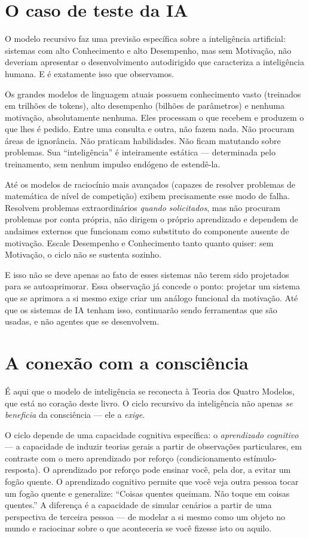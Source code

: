 \documentclass[11pt, twoside, openright]{book}
\begin{document}
\section*{O caso de teste da IA}

O modelo recursivo faz uma previsão específica sobre a inteligência artificial: sistemas com alto Conhecimento e alto Desempenho, mas sem Motivação, não deveriam apresentar o desenvolvimento autodirigido que caracteriza a inteligência humana. E é exatamente isso que observamos.

Os grandes modelos de linguagem atuais possuem conhecimento vasto (treinados em trilhões de tokens), alto desempenho (bilhões de parâmetros) e nenhuma motivação, absolutamente nenhuma. Eles processam o que recebem e produzem o que lhes é pedido. Entre uma consulta e outra, não fazem nada. Não procuram áreas de ignorância. Não praticam habilidades. Não ficam matutando sobre problemas. Sua ``inteligência'' é inteiramente estática --- determinada pelo treinamento, sem nenhum impulso endógeno de estendê-la.

Até os modelos de raciocínio mais avançados (capazes de resolver problemas de matemática de nível de competição) exibem precisamente esse modo de falha. Resolvem problemas extraordinários \textit{quando solicitados}, mas não procuram problemas por conta própria, não dirigem o próprio aprendizado e dependem de andaimes externos que funcionam como substituto do componente ausente de motivação. Escale Desempenho e Conhecimento tanto quanto quiser: sem Motivação, o ciclo não se sustenta sozinho.

E isso não se deve apenas ao fato de esses sistemas não terem sido projetados para se autoaprimorar. Essa observação já concede o ponto: projetar um sistema que se aprimora a si mesmo exige criar um análogo funcional da motivação. Até que os sistemas de IA tenham isso, continuarão sendo ferramentas que são usadas, e não agentes que se desenvolvem.

\section*{A conexão com a consciência}

É aqui que o modelo de inteligência se reconecta à Teoria dos Quatro Modelos, que está no coração deste livro. O ciclo recursivo da inteligência não apenas \textit{se beneficia} da consciência --- ele a \textit{exige}.

O ciclo depende de uma capacidade cognitiva específica: o \textit{aprendizado cognitivo} --- a capacidade de induzir teorias gerais a partir de observações particulares, em contraste com o mero aprendizado por reforço (condicionamento estímulo-resposta). O aprendizado por reforço pode ensinar você, pela dor, a evitar um fogão quente. O aprendizado cognitivo permite que você veja outra pessoa tocar um fogão quente e generalize: ``Coisas quentes queimam. Não toque em coisas quentes.'' A diferença é a capacidade de simular cenários a partir de uma perspectiva de terceira pessoa --- de modelar a si mesmo como um objeto no mundo e raciocinar sobre o que aconteceria se você fizesse isto ou aquilo.
\end{document}
